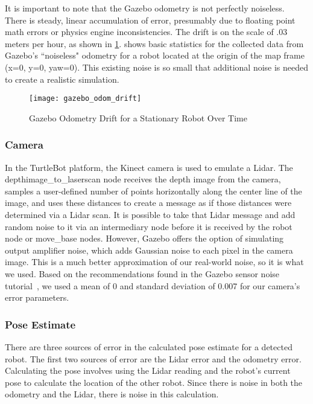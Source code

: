 \documentclass[thesis.tex]{subfile}
\begin{document}
It is important to note that the Gazebo odometry is not perfectly noiseless. There is steady, linear accumulation of error, presumably due to floating point math errors or physics engine inconsistencies. The drift is on the scale of $.03$ meters per hour, as shown in \cref{fig:gazebo_odom_drfit}.  shows basic statistics for the collected data from Gazebo's ``noiseless" odometry for a robot located at the origin of the map frame (x=0, y=0, yaw=0). This existing noise is so small that additional noise is needed to create a realistic simulation.



\begin{figure}[htbp]
\centering
\texttt{[image: gazebo\_odom\_drift]}
\caption{Gazebo Odometry Drift for a Stationary Robot Over Time}
\label{fig:gazebo_odom_drfit}
\end{figure}

\subsubsection{Camera}
In the TurtleBot platform, the Kinect camera is used to emulate a Lidar. The depthimage\_to\_laserscan node receives the depth image from the camera, samples a user-defined number of points horizontally along the center line of the image, and uses these distances to create a message as if those distances were determined via a Lidar scan. It is possible to take that Lidar message and add random noise to it via an intermediary node before it is received by the robot node or move\_base nodes. However, Gazebo offers the option of simulating output amplifier noise, which adds Gaussian noise to each pixel in the camera image. This is a much better approximation of our real-world noise, so it is what we used. Based on the recommendations found in the Gazebo sensor noise tutorial~\cite{GazeboSensorNoise}, we used a mean of 0 and standard deviation of 0.007 for our camera's error parameters.

\subsubsection{Pose Estimate}
There are three sources of error in the calculated pose estimate for a detected robot. The first two sources of error are the Lidar error and the odometry error. Calculating the pose involves using the Lidar reading and the robot's current pose to calculate the location of the other robot. Since there is noise in both the odometry and the Lidar, there is noise in this calculation.
\end{document}

